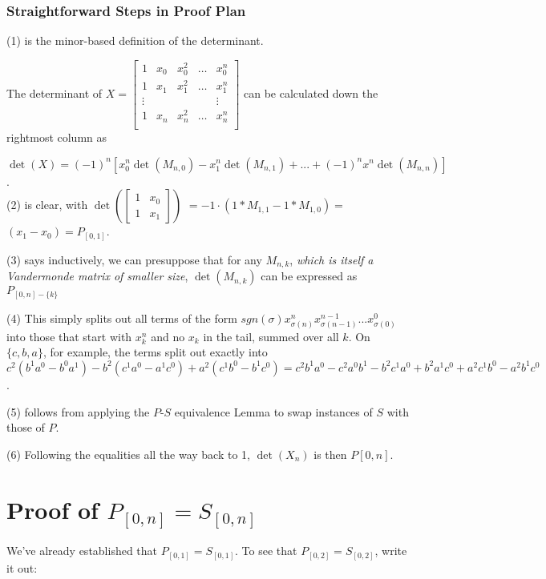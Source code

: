 \documentclass[11pt, oneside]{article} 	%
\begin{document}
\subsubsection{Straightforward Steps in Proof Plan}

(1) is the minor-based definition of the determinant.

The determinant of 
 $X = \begin{bmatrix}
1 & x_0 & x_0^2 & \ldots & x_0^{n} \\
1 & x_1 & x_1^2 & \ldots & x_1^{n} \\
\vdots & & & & \vdots  \\
1 & x_{n} & x_{n}^2 & \ldots & x_{n}^{n} \\
\end{bmatrix}
$ can be calculated down the rightmost column as

$\det(X) = (-1)^n [ x_0^n \det(M_{n,0}) - x_1^n \det(M_{n,1}) +  ... + (-1)^n x^n \det(M_{n,n})]$.
\\

(2) is clear, with 
$\det(\begin{bmatrix} 1 & x_0 \\ 1& x_1 \end{bmatrix})$
$= -1\cdot(1* M_{1, 1} - 1* M_{1,0}) = $
$(x_1 - x_0) = P_{[0,1]}$.

(3) says inductively, we can presuppose that  for any $M_{n, k}$, \emph{which is itself a Vandermonde matrix of smaller size}, $\det(M_{n,k})$ can be expressed as $P_{[0,n] - \{k\}}$

(4) This simply splits out all terms of the form $sgn(\sigma) x_{\sigma(n)}^{n} x_{\sigma(n-1)}^{n-1} ... x_{\sigma(0)}^{0}$ into those that start with $x_k^n$ and no $x_k$ in the tail, summed over all $k$.   On  $\{c,b,a\}$, for example, the terms split out exactly into $c^2(b^1a^0 - b^0a^1) - b^2(c^1a^0-a^1c^0) + a^2(c^1b^0-b^1c^0) = c^2b^1a^0 - c^2a^0b^1 - b^2c^1a^0 + b^2a^1c^0 + a^2c^1b^0 - a^2b^1c^0$.

(5) follows from applying the $P$-$S$ equivalence Lemma to swap instances of $S$ with those of $P$.

(6) Following the equalities all the way back to 1, $\det(X_n)$ is then $P[0,n]$.

\section{Proof of $P_{[0,n]} = S_{[0,n]}$}
 
We've already established that $P_{[0,1]} = S_{[0,1]}$.  To see that $P_{[0,2]} = S_{[0,2]}$, write it out:
\end{document}
